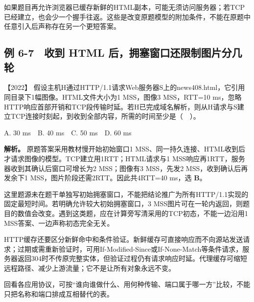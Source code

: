 如果题目再允许浏览器已缓存新鲜的HTML副本，可能无须访问服务器；若TCP已经建立，也会少一个握手往返。这些是改变原题模型的附加条件，不能在原题中任意引入后声称存在另一个更短答案。

\subsection{例 6-7　收到 HTML 后，拥塞窗口还限制图片分几轮}\label{cn-ex6-7}

\noindent{}【2022】 假设主机H通过HTTP/1.1请求Web服务器S上的news408.html，它引用同目录下1幅图像。HTML文件大小为1 MSS，图像3 MSS，RTT=10 ms，忽略HTTP响应首部开销和TCP段传输时延。若H已完成域名解析，则从H请求与S建立TCP连接时刻起，到收到全部内容，所需的时间至少是（　）。

A. 30 ms　B. 40 ms　C. 50 ms　D. 60 ms


\textbf{解析。} 原题答案采用教材慢开始初始窗口1 MSS、同一持久连接、HTML收到后才请求图像的模型。TCP建立用1RTT；HTML请求与1 MSS响应再1RTT，服务器收到其确认后窗口可增长为2 MSS；图像有3 MSS，先发2 MSS，收到确认后再发余下1 MSS，图片阶段还需2RTT。因此共4RTT=40 ms，选 \textbf{B}。

这里题源未在题干单独写初始拥塞窗口，不能把结论推广为所有HTTP/1.1实现的固定最短时间。若明确允许较大初始拥塞窗口，3 MSS图片可在一轮内返回，则题目的数值会改变。遇到这类题，应在计算旁写清采用的TCP初态，不能一边沿用1 MSS答案、一边声称初态完全无关。

HTTP缓存还要区分新鲜命中和条件验证。新鲜缓存可直接响应而不向源站发送请求；过期或需重新验证时，可用If-Modified-Since或If-None-Match等条件请求，服务器返回304时不传原完整实体，但验证过程仍有请求响应时延。代理缓存可缩短远程路径、减少上游流量；它不是让所有对象永远不变。

回看各应用协议，可按``谁向谁做什么、用何种传输、端口属于哪一方''比较，不能只把名称和端口排成互相替代的表。

